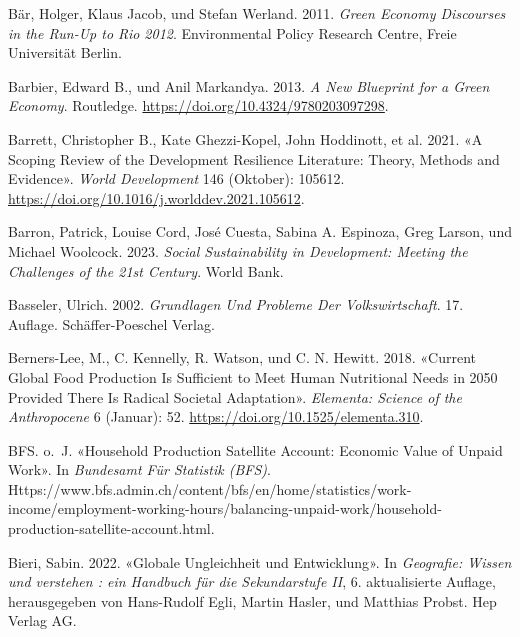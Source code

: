 \documentclass[
  nswissgerman,
  a4paper,
  DIV=11,
  numbers=noendperiod,
  oneside,
  openany]{scrreprt}
\newlength{\cslhangindent}
\newenvironment{CSLReferences}[2] %
 {\begin{list}{}{%
  \setlength{\itemindent}{0pt}
  \setlength{\leftmargin}{0pt}
  \setlength{\parsep}{0pt}
  \ifodd #1
   \setlength{\leftmargin}{\cslhangindent}
   \setlength{\itemindent}{-1\cslhangindent}
  \fi
  \setlength{\itemsep}{#2\baselineskip}}}
 {\end{list}}
\begin{document}
\begin{CSLReferences}{1}{1}
Bär, Holger, Klaus Jacob, und Stefan Werland. 2011. \emph{Green {Economy
Discourses} in the {Run-Up} to {Rio} 2012}. Environmental Policy
Research Centre, Freie Universität Berlin.

Barbier, Edward B., und Anil Markandya. 2013. \emph{A {New Blueprint}
for a {Green Economy}}. Routledge.
\url{https://doi.org/10.4324/9780203097298}.

Barrett, Christopher B., Kate Ghezzi-Kopel, John Hoddinott, et al. 2021.
{«A Scoping Review of the Development Resilience Literature: {Theory},
Methods and Evidence»}. \emph{World Development} 146 (Oktober): 105612.
\url{https://doi.org/10.1016/j.worlddev.2021.105612}.

Barron, Patrick, Louise Cord, José Cuesta, Sabina A. Espinoza, Greg
Larson, und Michael Woolcock. 2023. \emph{Social {Sustainability} in
{Development}: {Meeting} the {Challenges} of the 21st {Century}}. World
Bank.

Basseler, Ulrich. 2002. \emph{Grundlagen Und {Probleme} Der
{Volkswirtschaft}}. 17. Auflage. Sch{ä}ffer-Poeschel Verlag.

Berners-Lee, M., C. Kennelly, R. Watson, und C. N. Hewitt. 2018.
{«Current Global Food Production Is Sufficient to Meet Human Nutritional
Needs in 2050 Provided There Is Radical Societal Adaptation»}.
\emph{Elementa: Science of the Anthropocene} 6 (Januar): 52.
\url{https://doi.org/10.1525/elementa.310}.

BFS. o.~J. {«Household Production Satellite Account: {Economic} Value of
Unpaid Work»}. In \emph{Bundesamt Für Statistik (BFS)}.
Https://www.bfs.admin.ch/content/bfs/en/home/statistics/work-income/employment-working-hours/balancing-unpaid-work/household-production-satellite-account.html.

Bieri, Sabin. 2022. {«Globale {Ungleichheit} und {Entwicklung}»}. In
\emph{Geografie: {Wissen} und verstehen : ein {Handbuch} für die
{Sekundarstufe} {II}}, 6. aktualisierte Auflage, herausgegeben von
Hans-Rudolf Egli, Martin Hasler, und Matthias Probst. Hep Verlag AG.


\end{CSLReferences}
\end{document}
